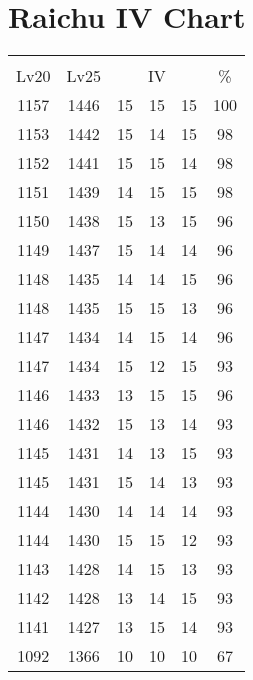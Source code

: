\documentclass{article}%
\begin{document}
%
\normalsize%
\section{Raichu IV Chart}%
\label{sec:Raichu IV Chart}%
\renewcommand{\arraystretch}{1.5}%
\begin{tabular}{|c|c|c|c|c|c|}%
\hline%
\multicolumn{6}{|c|}{\textcolor{white}{ 
\linebreak{Raichu}
}%
\cellcolor{black}}\\%
\multicolumn{1}{|c}{Lv20}&\multicolumn{1}{c|}{Lv25}&\multicolumn{3}{c|}{IV}&\multicolumn{1}{|c|}{\%}\\%
\hline%
\rowcolor{color100}%
1157&1446&15&15&15&100\\%
\hline%
\rowcolor{color98}%
1153&1442&15&14&15&98\\%
\hline%
\rowcolor{color98}%
1152&1441&15&15&14&98\\%
\hline%
\rowcolor{color98}%
1151&1439&14&15&15&98\\%
\hline%
\rowcolor{color96}%
1150&1438&15&13&15&96\\%
\hline%
\rowcolor{color96}%
1149&1437&15&14&14&96\\%
\hline%
\rowcolor{color96}%
1148&1435&14&14&15&96\\%
\hline%
\rowcolor{color96}%
1148&1435&15&15&13&96\\%
\hline%
\rowcolor{color96}%
1147&1434&14&15&14&96\\%
\hline%
\rowcolor{color93}%
1147&1434&15&12&15&93\\%
\hline%
\rowcolor{color96}%
1146&1433&13&15&15&96\\%
\hline%
\rowcolor{color93}%
1146&1432&15&13&14&93\\%
\hline%
\rowcolor{color93}%
1145&1431&14&13&15&93\\%
\hline%
\rowcolor{color93}%
1145&1431&15&14&13&93\\%
\hline%
\rowcolor{color93}%
1144&1430&14&14&14&93\\%
\hline%
\rowcolor{color93}%
1144&1430&15&15&12&93\\%
\hline%
\rowcolor{color93}%
1143&1428&14&15&13&93\\%
\hline%
\rowcolor{color93}%
1142&1428&13&14&15&93\\%
\hline%
\rowcolor{color93}%
1141&1427&13&15&14&93\\%
\hline%
\rowcolor{color91}%
1092&1366&10&10&10&67\\%
\end{tabular}

%
\end{document}
